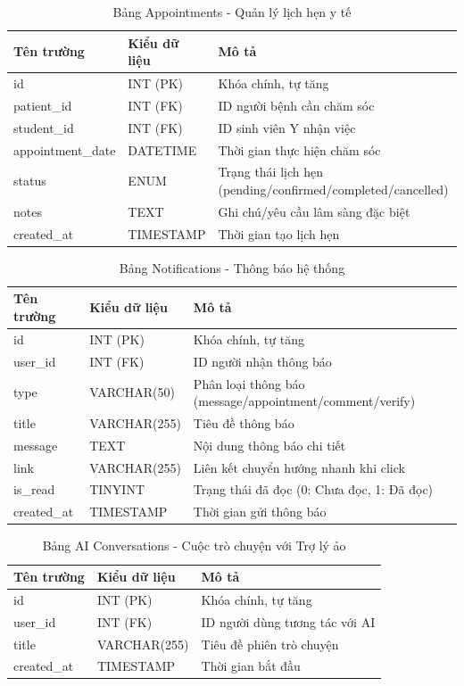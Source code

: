 \documentclass[13pt,a4paper]{extreport}
\begin{document}
\begin{table}[H]
\centering
\caption{Bảng Appointments - Quản lý lịch hẹn y tế}
\begin{tabular}{|l|l|l|}
\hline
\textbf{Tên trường} & \textbf{Kiểu dữ liệu} & \textbf{Mô tả} \\
\hline
id & INT (PK) & Khóa chính, tự tăng \\
patient\_id & INT (FK) & ID người bệnh cần chăm sóc \\
student\_id & INT (FK) & ID sinh viên Y nhận việc \\
appointment\_date & DATETIME & Thời gian thực hiện chăm sóc \\
status & ENUM & Trạng thái lịch hẹn (pending/confirmed/completed/cancelled) \\
notes & TEXT & Ghi chú/yêu cầu lâm sàng đặc biệt \\
created\_at & TIMESTAMP & Thời gian tạo lịch hẹn \\
\hline
\end{tabular}
\end{table}

\begin{table}[H]
\centering
\caption{Bảng Notifications - Thông báo hệ thống}
\begin{tabular}{|l|l|l|}
\hline
\textbf{Tên trường} & \textbf{Kiểu dữ liệu} & \textbf{Mô tả} \\
\hline
id & INT (PK) & Khóa chính, tự tăng \\
user\_id & INT (FK) & ID người nhận thông báo \\
type & VARCHAR(50) & Phân loại thông báo (message/appointment/comment/verify) \\
title & VARCHAR(255) & Tiêu đề thông báo \\
message & TEXT & Nội dung thông báo chi tiết \\
link & VARCHAR(255) & Liên kết chuyển hướng nhanh khi click \\
is\_read & TINYINT & Trạng thái đã đọc (0: Chưa đọc, 1: Đã đọc) \\
created\_at & TIMESTAMP & Thời gian gửi thông báo \\
\hline
\end{tabular}
\end{table}

\begin{table}[H]
\centering
\caption{Bảng AI Conversations - Cuộc trò chuyện với Trợ lý ảo}
\begin{tabular}{|l|l|l|}
\hline
\textbf{Tên trường} & \textbf{Kiểu dữ liệu} & \textbf{Mô tả} \\
\hline
id & INT (PK) & Khóa chính, tự tăng \\
user\_id & INT (FK) & ID người dùng tương tác với AI \\
title & VARCHAR(255) & Tiêu đề phiên trò chuyện \\
created\_at & TIMESTAMP & Thời gian bắt đầu \\
\hline
\end{tabular}
\end{table}
\end{document}
